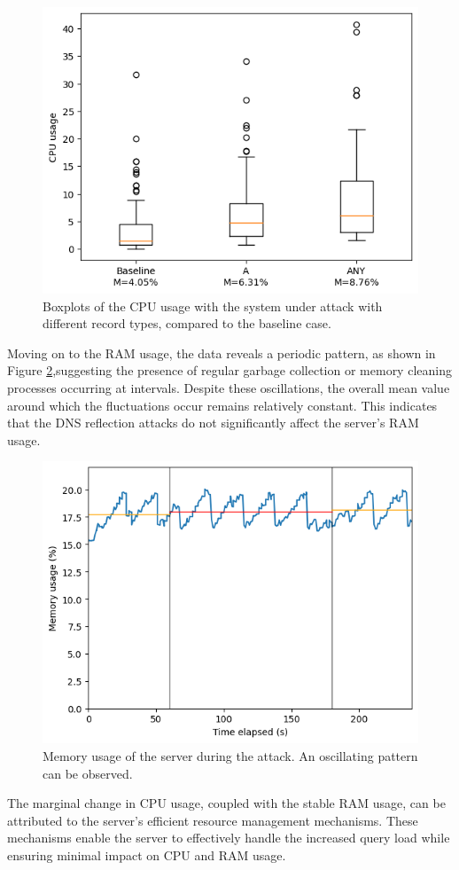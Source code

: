 \begin{figure}[H]
    \centering
    \includegraphics[width=\columnwidth]{Sections/Images/Boxplots_Server.png}
    \caption{Boxplots of the CPU usage with the system under attack with different record types, compared to the baseline case.}
    \label{fig:Boxplots_server}
\end{figure}
\noindent Moving on to the RAM usage, the data reveals a periodic pattern, as shown in Figure \ref{fig:Memory_server},suggesting the presence of regular garbage collection or memory cleaning processes occurring at intervals. Despite these oscillations, the overall mean value around which the fluctuations occur remains relatively constant. This indicates that the DNS reflection attacks do not significantly affect the server's RAM usage.\\
\begin{figure}[H]
    \centering
    \includegraphics[width=\columnwidth]{Sections/Images/Memory_Server.png}
    \caption{Memory usage of the server during the attack. An oscillating pattern can be observed.}
    \label{fig:Memory_server}
\end{figure}
\noindent The marginal change in CPU usage, coupled with the stable RAM usage, can be attributed to the server's efficient resource management mechanisms. These mechanisms enable the server to effectively handle the increased query load while ensuring minimal impact on CPU and RAM usage.